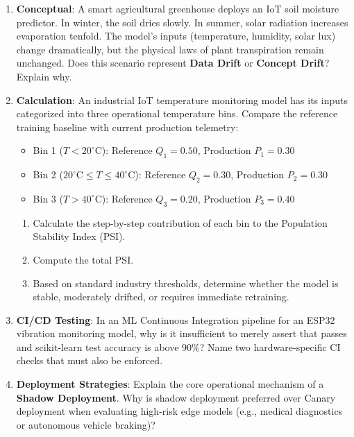 \begin{checkyourself}
\begin{enumerate}
    \item \textbf{Conceptual}: A smart agricultural greenhouse deploys an IoT soil moisture predictor. In winter, the soil dries slowly. In summer, solar radiation increases evaporation tenfold. The model's inputs (temperature, humidity, solar lux) change dramatically, but the physical laws of plant transpiration remain unchanged. Does this scenario represent \textbf{Data Drift} or \textbf{Concept Drift}? Explain why.
    \item \textbf{Calculation}: An industrial IoT temperature monitoring model has its inputs categorized into three operational temperature bins. Compare the reference training baseline with current production telemetry:
    \begin{itemize}
        \item Bin 1 ($T < 20^\circ\text{C}$): Reference $Q_1 = 0.50$, Production $P_1 = 0.30$
        \item Bin 2 ($20^\circ\text{C} \le T \le 40^\circ\text{C}$): Reference $Q_2 = 0.30$, Production $P_2 = 0.30$
        \item Bin 3 ($T > 40^\circ\text{C}$): Reference $Q_3 = 0.20$, Production $P_3 = 0.40$
    \end{itemize}
    \begin{enumerate}
        \item Calculate the step-by-step contribution of each bin to the Population Stability Index (PSI).
        \item Compute the total PSI.
        \item Based on standard industry thresholds, determine whether the model is stable, moderately drifted, or requires immediate retraining.
    \end{enumerate}
    \item \textbf{CI/CD Testing}: In an ML Continuous Integration pipeline for an ESP32 vibration monitoring model, why is it insufficient to merely assert that  passes and scikit-learn test accuracy is above $90\%$? Name two hardware-specific CI checks that must also be enforced.
    \item \textbf{Deployment Strategies}: Explain the core operational mechanism of a \textbf{Shadow Deployment}. Why is shadow deployment preferred over Canary deployment when evaluating high-risk edge models (e.g., medical diagnostics or autonomous vehicle braking)?
\end{enumerate}
\end{checkyourself}

